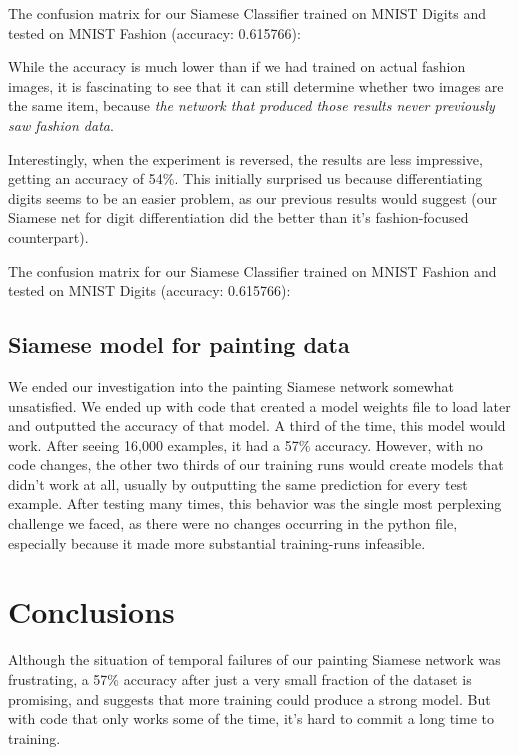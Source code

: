 \documentclass[a4paper, 11pt]{article}
\begin{document}
The confusion matrix for our Siamese Classifier trained on MNIST Digits and tested on MNIST Fashion (accuracy: 0.615766):


While the accuracy is much lower than if we had trained on actual fashion images, it is fascinating to see that it can still determine whether two images are the same item, because \textit{the network that produced those results never previously saw fashion data}.

Interestingly, when the experiment is reversed, the results are less impressive, getting an accuracy of 54\%. This initially surprised us because differentiating digits seems to be an easier problem, as our previous results would suggest (our Siamese net for digit differentiation did the better than it’s fashion-focused counterpart). 

The confusion matrix for our Siamese Classifier trained on MNIST Fashion and tested on MNIST Digits (accuracy: 0.615766):


\subsection{Siamese model for painting data}

We ended our investigation into the painting Siamese network somewhat unsatisfied. We ended up with code that created a model weights file to load later and outputted the accuracy of that model. A third of the time, this model would work. After seeing 16,000 examples, it had a 57\% accuracy. However, with no code changes, the other two thirds of our training runs would create models that didn’t work at all, usually by outputting the same prediction for every test example. After testing many times, this behavior was the single most perplexing challenge we faced, as there were no changes occurring in the python file, especially because it made more substantial training-runs infeasible.

\section{Conclusions}

Although the situation of temporal failures of our painting Siamese network was frustrating, a 57\% accuracy after just a very small fraction of the dataset is promising, and suggests that more training could produce a strong model. But with code that only works some of the time, it’s hard to commit a long time to training.
\end{document}
